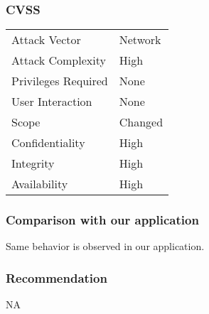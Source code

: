 \subsubsection{CVSS}
\begin{tabular}{l | l}
Attack Vector		& Network \\
Attack Complexity	& High \\
Privileges Required & None \\
User Interaction	& None \\
Scope				& Changed \\
Confidentiality		& High \\
Integrity			& High \\
Availability		& High
\end{tabular}

\subsubsection{Comparison with our application}
Same behavior is observed in our application.

\subsubsection{Recommendation}
NA
\clearpage